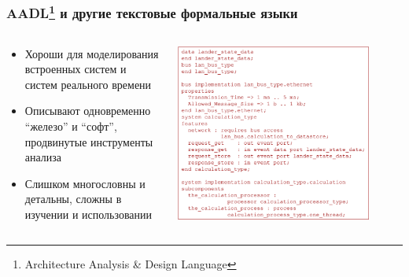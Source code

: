 \documentclass{../../slides-style}
\begin{document}
    \begin{frame}
        \frametitle{AADL\footnote{Architecture Analysis \& Design Language} и другие текстовые формальные языки}
        \begin{columns}
            \begin{column}{0.4\textwidth}
                \begin{small}
                    \begin{itemize}
                        \item Хороши для моделирования встроенных систем и систем реального времени
                        \item Описывают одновременно ``железо'' и ``софт'', продвинутые инструменты анализа
                        \item Слишком многословны и детальны, сложны в изучении и использовании
                    \end{itemize}
                \end{small}
            \end{column}
            \begin{column}{0.6\textwidth}
                \begin{center}
                    \includegraphics[width=0.85\textwidth]{aadl.png}
                \end{center}
            \end{column}
        \end{columns}
    \end{frame}
\end{document}
